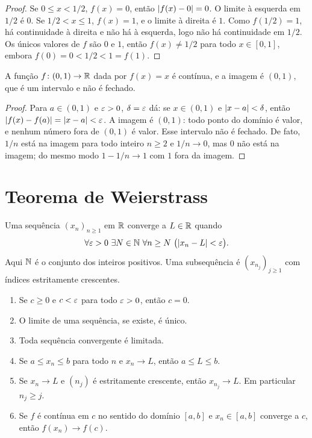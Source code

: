 \documentclass[11pt,a4paper]{article}
\begin{document}
\begin{proof}
Se $0\le x<1/2$, $f(x)=0$, ent\~ao $\left\lvert f(x)-0 \right\rvert=0$. O limite \`a esquerda em $1/2$ \'e $0$. Se $1/2<x\le 1$, $f(x)=1$, e o limite \`a direita \'e $1$. Como $f(1/2)=1$, h\'a continuidade \`a direita e n\~ao h\'a \`a esquerda, logo n\~ao h\'a continuidade em $1/2$. Os \'unicos valores de $f$ s\~ao $0$ e $1$, ent\~ao $f(x)\neq 1/2$ para todo $x\in[0,1]$, embora $f(0)=0<1/2<1=f(1)$.
\end{proof}

\begin{proposicao}
\label{prop:aberta}
A fun\c{c}\~ao $f\colon(0,1)\to\mathbb{R}$ dada por $f(x)=x$ \'e cont\'inua, e a imagem \'e $(0,1)$, que \'e um intervalo e n\~ao \'e fechado.
\end{proposicao}

\begin{proof}
Para $a\in(0,1)$ e $\varepsilon>0$, $\delta=\varepsilon$ d\'a: se $x\in(0,1)$ e $\left\lvert x-a \right\rvert<\delta$, ent\~ao $\left\lvert f(x)-f(a) \right\rvert=\left\lvert x-a \right\rvert<\varepsilon$. A imagem \'e $(0,1)$: todo ponto do dom\'inio \'e valor, e nenhum n\'umero fora de $(0,1)$ \'e valor. Esse intervalo n\~ao \'e fechado. De fato, $1/n$ est\'a na imagem para todo inteiro $n\ge 2$ e $1/n\to 0$, mas $0$ n\~ao est\'a na imagem; do mesmo modo $1-1/n\to 1$ com $1$ fora da imagem.
\end{proof}


\section{Teorema de Weierstrass}
\label{sec:weierstrass}

Uma sequ\^encia $(x_n)_{n\ge 1}$ em $\mathbb{R}$ converge a $L\in\mathbb{R}$ quando
\[
\forall\eps>0\ \exists N\in\N\ \forall n\ge N\ \bigl(\abs{x_n-L}<\eps\bigr).
\]
Aqui $\mathbb{N}$ \'e o conjunto dos inteiros positivos. Uma subsequ\^encia \'e $(x_{n_j})_{j\ge 1}$ com \'indices estritamente crescentes.

\begin{lema}
\label{lem:seq}
\begin{enumerate}
\item Se $c\ge 0$ e $c<\varepsilon$ para todo $\varepsilon>0$, ent\~ao $c=0$.
\item O limite de uma sequ\^encia, se existe, \'e \'unico.
\item Toda sequ\^encia convergente \'e limitada.
\item Se $a\le x_n\le b$ para todo $n$ e $x_n\to L$, ent\~ao $a\le L\le b$.
\item Se $x_n\to L$ e $(n_j)$ \'e estritamente crescente, ent\~ao $x_{n_j}\to L$. Em particular $n_j\ge j$.
\item Se $f$ \'e cont\'inua em $c$ no sentido do dom\'inio $[a,b]$ e $x_n\in[a,b]$ converge a $c$, ent\~ao $f(x_n)\to f(c)$.
\end{enumerate}
\end{lema}
\end{document}
